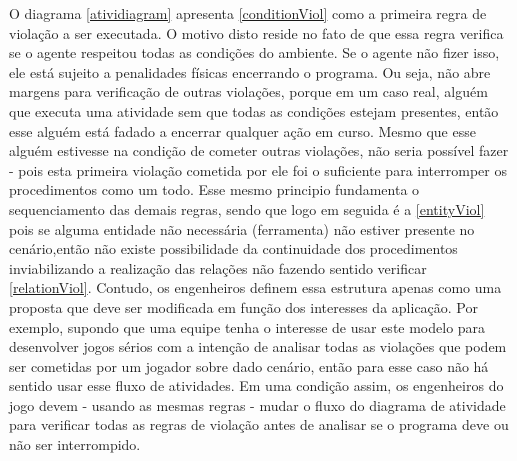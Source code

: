 O diagrama \ref{atividiagram} apresenta \ref{conditionViol} como a primeira regra de violação a ser executada. O motivo disto reside no fato de que essa regra verifica se o agente respeitou todas as condições do ambiente. Se o agente não fizer isso, ele está sujeito a penalidades físicas encerrando o programa. Ou seja, não abre margens para verificação de outras violações, porque em um caso real, alguém que executa uma atividade sem que todas as condições estejam presentes, então esse alguém está fadado a encerrar qualquer ação em curso. Mesmo que esse alguém estivesse na condição de cometer outras violações, não seria possível fazer - pois esta primeira violação cometida por ele foi o suficiente para interromper os procedimentos como um todo. Esse mesmo principio fundamenta o sequenciamento das demais regras, sendo que logo em seguida é a \ref{entityViol} pois se alguma entidade não necessária (ferramenta) não estiver presente no cenário,então não existe possibilidade da continuidade dos procedimentos inviabilizando a realização das relações não fazendo sentido verificar \ref{relationViol}. Contudo, os engenheiros definem essa estrutura apenas como uma proposta que deve ser modificada em função dos interesses da aplicação. Por exemplo, supondo que uma equipe tenha o interesse de usar este modelo para desenvolver jogos sérios com a intenção de analisar todas as violações que podem ser cometidas por um jogador sobre dado cenário, então para esse caso não há sentido usar esse fluxo de atividades. Em uma condição assim, os engenheiros do jogo devem - usando as mesmas regras - mudar o fluxo do diagrama de atividade para verificar todas as regras de violação antes de analisar se o programa deve ou não ser interrompido.